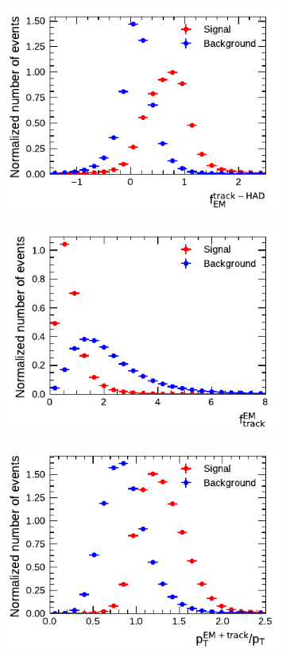 \begin{figure}[!ht]\ContinuedFloat
  \begin{subfigure}{0.5\textwidth}
    \centering
    \includegraphics{./figures/baseline_bdt_vars/3p/ChPiEMEOverCaloEME.pdf}
  \end{subfigure}%
  \begin{subfigure}{0.5\textwidth}
    \centering
    \includegraphics{./figures/baseline_bdt_vars/3p/EMPOverTrkSysP.pdf}
  \end{subfigure}
  \begin{subfigure}{0.5\textwidth}
    \centering
    \includegraphics{./figures/baseline_bdt_vars/3p/ptRatioEflowApprox.pdf}

\end{subfigure}
\end{figure}
